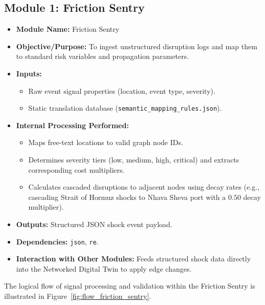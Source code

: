 \subsection[Module 1: Friction Sentry]{Module 1: Friction Sentry}
\begin{itemize}
    \item \textbf{Module Name:} Friction Sentry
    \item \textbf{Objective/Purpose:} To ingest unstructured disruption logs and map them to standard risk variables and propagation parameters.
    \item \textbf{Inputs:}
    \begin{itemize}
        \item Raw event signal properties (location, event type, severity).
        \item Static translation database (\texttt{semantic\_mapping\_rules.json}).
    \end{itemize}
    \item \textbf{Internal Processing Performed:}
    \begin{itemize}
        \item Maps free-text locations to valid graph node IDs.
        \item Determines severity tiers (low, medium, high, critical) and extracts corresponding cost multipliers.
        \item Calculates cascaded disruptions to adjacent nodes using decay rates (e.g., cascading Strait of Hormuz shocks to Nhava Sheva port with a $0.50$ decay multiplier).
    \end{itemize}
    \item \textbf{Outputs:} Structured JSON shock event payload.
    \item \textbf{Dependencies:} \texttt{json}, \texttt{re}.
    \item \textbf{Interaction with Other Modules:} Feeds structured shock data directly into the Networked Digital Twin to apply edge changes.
\end{itemize}
The logical flow of signal processing and validation within the Friction Sentry is illustrated in Figure~\ref{fig:flow_friction_sentry}.

